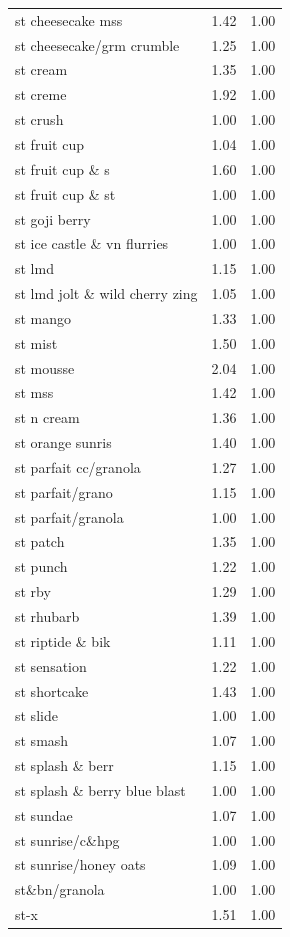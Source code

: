 \begin{table}
\begin{tabular}{lrr}
st cheesecake mss & 1.42 & 1.00 \\
st cheesecake/grm crumble & 1.25 & 1.00 \\
st cream & 1.35 & 1.00 \\
st creme & 1.92 & 1.00 \\
st crush & 1.00 & 1.00 \\
st fruit cup & 1.04 & 1.00 \\
st fruit cup \& s & 1.60 & 1.00 \\
st fruit cup \& st & 1.00 & 1.00 \\
st goji berry & 1.00 & 1.00 \\
st ice castle \& vn flurries & 1.00 & 1.00 \\
st lmd & 1.15 & 1.00 \\
st lmd jolt \& wild cherry zing & 1.05 & 1.00 \\
st mango & 1.33 & 1.00 \\
st mist & 1.50 & 1.00 \\
st mousse & 2.04 & 1.00 \\
st mss & 1.42 & 1.00 \\
st n cream & 1.36 & 1.00 \\
st orange sunris & 1.40 & 1.00 \\
st parfait cc/granola & 1.27 & 1.00 \\
st parfait/grano & 1.15 & 1.00 \\
st parfait/granola & 1.00 & 1.00 \\
st patch & 1.35 & 1.00 \\
st punch & 1.22 & 1.00 \\
st rby & 1.29 & 1.00 \\
st rhubarb & 1.39 & 1.00 \\
st riptide \& bik & 1.11 & 1.00 \\
st sensation & 1.22 & 1.00 \\
st shortcake & 1.43 & 1.00 \\
st slide & 1.00 & 1.00 \\
st smash & 1.07 & 1.00 \\
st splash \& berr & 1.15 & 1.00 \\
st splash \& berry blue blast & 1.00 & 1.00 \\
st sundae & 1.07 & 1.00 \\
st sunrise/c\&hpg & 1.00 & 1.00 \\
st sunrise/honey oats & 1.09 & 1.00 \\
st\&bn/granola & 1.00 & 1.00 \\
st-x & 1.51 & 1.00 \\

\end{tabular}
\end{table}
